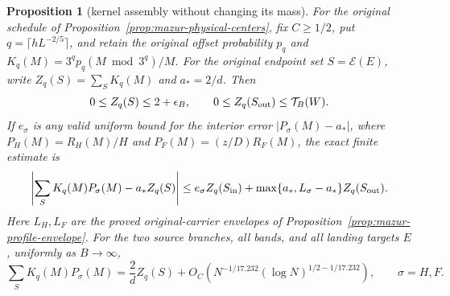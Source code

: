 \documentclass[11pt]{article}
\newtheorem{proposition}{Proposition}
\theoremstyle{remark}\newtheorem{remark}[proposition]{Remark}
\begin{document}
\begin{proposition}[kernel assembly without changing its mass]
\label{prop:mazur-full-profile}
For the original schedule of Proposition~\ref{prop:mazur-physical-centers},
fix $C\ge1/2$, put
$q=\lceil hL^{-2/5}\rceil$, and retain the original offset probability
$p_q$ and $K_q(M)=3^qp_q(M\bmod3^q)/M$.
For the original endpoint set $S=\mathcal E(E)$, write
$Z_q(S)=\sum_SK_q(M)$ and $a_*=2/d$.
Then
\[
 0\le Z_q(S)\le2+\epsilon_B,\qquad
 0\le Z_q(S_{\rm out})\le\mathcal T_B(W).
\]
If $e_\sigma$ is any valid uniform bound for the interior error
$|P_\sigma(M)-a_*|$, where $P_H(M)=R_H(M)/H$ and
$P_F(M)=(z/D)R_F(M)$, the exact finite estimate is
\begin{equation}
 \left|\sum_SK_q(M)P_\sigma(M)-a_*Z_q(S)\right|
 \le e_\sigma Z_q(S_{\rm in})
    +\max\{a_*,L_\sigma-a_*\}Z_q(S_{\rm out}).
 \label{eq:mazur-full-finite}
\end{equation}
Here $L_H,L_F$ are the proved original-carrier envelopes of
Proposition~\ref{prop:mazur-profile-envelope}.
For the two source branches, all bands, and all landing targets $E$,
uniformly as $B\to\infty$,
\begin{equation}
 \sum_SK_q(M)P_\sigma(M)
 =\frac2d Z_q(S)+
 O_C\!\left(N^{-1/17.232}(\log N)^{1/2-1/17.232}\right),
 \qquad \sigma=H,F.
 \label{eq:mazur-full-profile-rate}
\end{equation}
\end{proposition}
\end{document}

